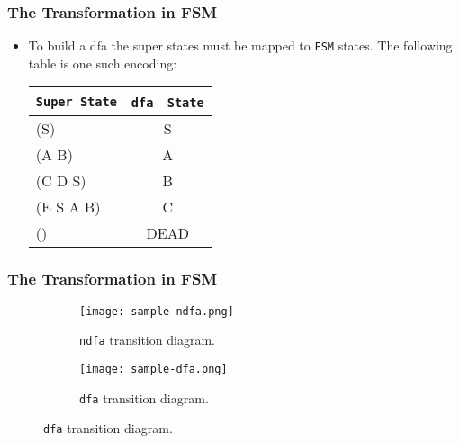 \documentclass{beamer}
\begin{document}
\begin{frame}[fragile]
\frametitle{The Transformation in FSM}
\begin{scriptsize}
\begin{itemize}
\normalsize
\item<1-> To build a dfa the super states must be mapped to \texttt{FSM} states. The following table is one such encoding:

\begin{center}
\begin{tabular}{|l|c|}
  \hline
  \texttt{Super State} & \texttt{dfa} \ \texttt{State}  \\ \hline
  (S)         & S         \\ \hline
  (A B)       & A         \\ \hline
  (C D S)     & B         \\ \hline
  (E S A B)   & C         \\ \hline
  ()          & DEAD      \\ \hline
\end{tabular}
\end{center}
\end{itemize}
\end{scriptsize}
\end{frame}

\begin{frame}[fragile]
\frametitle{The Transformation in FSM}
\begin{scriptsize}
\begin{itemize}
\normalsize
\item<1->
\begin{figure}[t!]
\centering
\begin{subfigure}{0.7\textwidth}
\centering
\texttt{[image: sample-ndfa.png]}
\caption{\texttt{ndfa} transition diagram.}
\label{samplendfa-graph}
\end{subfigure}
\hfill
\item<2->
\begin{subfigure}{0.7\textwidth}
\centering
\texttt{[image: sample-dfa.png]}
\caption{\texttt{dfa} transition diagram.}
\label{sample-dfa}
\end{subfigure}
\end{figure}
\end{itemize}
\end{scriptsize}
\end{frame}
\end{document}
